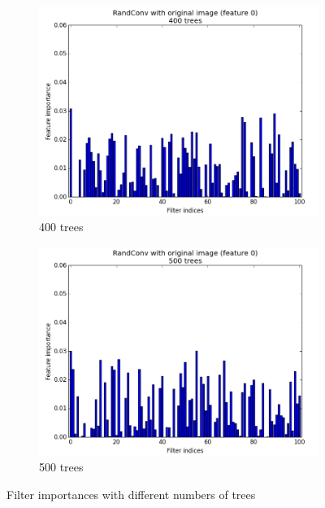 \documentclass[a4paper]{report}
\begin{document}
\begin{figure}
\begin{subfigure}{.5\textwidth}
				\includegraphics[width=1.\linewidth]{images/FI400trees.png}
				\caption{\label{fig:FI400trees}400 trees}
			\end{subfigure}%
			\begin{subfigure}{.5\textwidth}
				\centering
				\includegraphics[width=1.\linewidth]{images/FI500trees.png}
				\caption{\label{fig:FI500trees}500 trees}
			\end{subfigure}
			\caption{\label{fig:FINbTrees}Filter importances with different numbers of trees}
			
		\end{figure}
		
		
		
		
		
\end{document}
